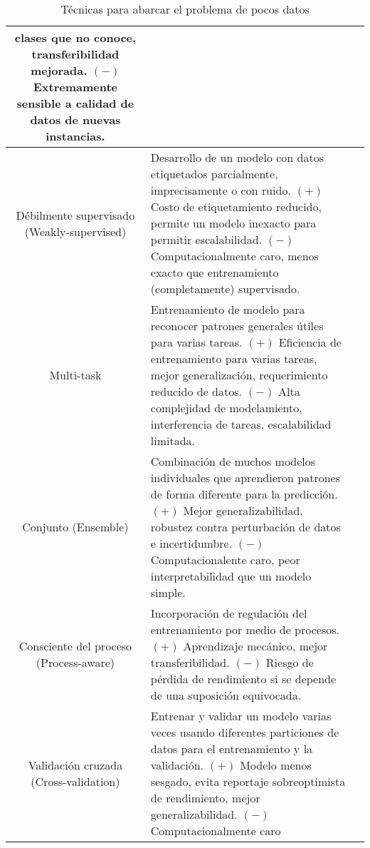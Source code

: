 \begin{center}
\begin{table}[h!]
\begin{tabular}{ |c|m{9.5cm}|c| }
            clases que no conoce, transferibilidad mejorada. $(-)$ Extremamente sensible a calidad de datos de nuevas
            instancias. & \autocite{safonova-2023} \\
            \hline
            \makecell{Débilmente supervisado \\ (Weakly-supervised)} & Desarrollo de un modelo con datos etiquetados
            parcialmente, imprecisamente o con ruido. $(+)$ Costo de etiquetamiento reducido, permite un modelo
            inexacto para permitir escalabilidad. $(-)$ Computacionalmente caro, menos exacto que entrenamiento
            (completamente) supervisado. & \autocite{safonova-2023} \\
            \hline
            Multi-task & Entrenamiento de modelo para reconocer patrones generales útiles para varias tareas. $(+)$
            Eficiencia de entrenamiento para varias tareas, mejor generalización, requerimiento reducido de datos.
            $(-)$ Alta complejidad de modelamiento, interferencia de tareas, escalabilidad limitada. &
            \autocite{safonova-2023} \\
            \hline
            Conjunto (Ensemble) & Combinación de muchos modelos individuales que aprendieron patrones de forma
            diferente para la predicción. $(+)$ Mejor generalizabilidad, robustez contra perturbación de datos e
            incertidumbre. $(-)$ Computacionalente caro, peor interpretabilidad que un modelo simple. &
            \autocite{safonova-2023,langkvist-2016,pritt-2017} \\
            \hline
            \makecell{Consciente del proceso \\ (Process-aware)} & Incorporación de regulación del entrenamiento por
            medio de procesos. $(+)$ Aprendizaje mecánico, mejor transferibilidad. $(-)$ Riesgo de pérdida de
            rendimiento si se depende de una suposición equivocada. & \autocite{safonova-2023} \\
            \hline
            \makecell{Validación cruzada \\ (Cross-validation)} & Entrenar y validar un modelo varias veces usando
            diferentes particiones de datos para el entrenamiento y la validación. $(+)$ Modelo menos sesgado, evita
            reportaje sobreoptimista de rendimiento, mejor generalizabilidad. $(-)$ Computacionalmente caro &
            \autocite{safonova-2023} \\
            \hline
        \end{tabular}
        \caption{Técnicas para abarcar el problema de pocos datos}
        \label{table:3}
    \end{table}
\end{center}
